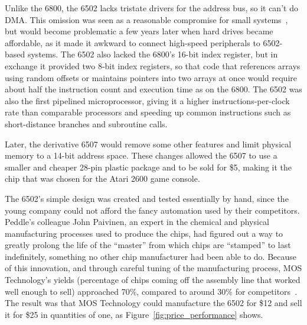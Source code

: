 \begin{tangent}
    Unlike the 6800, the 6502 lacks
    tristate drivers for the address bus, so it can't do DMA.  This
    omission was seen as a reasonable compromise
    for small systems~\cite{byte75:6502}, but would become
    problematic a few years later when hard drives became affordable, as
    it made it awkward to connect high-speed peripherals to 6502-based systems.
    The 6502 also lacked the 6800's 16-bit index register, but in exchange
    it provided two
     8-bit index registers, so that code that references arrays using
     random offsets or maintains pointers into two arrays at once would
     require about half the instruction count and execution time as on
     the 6800.
    The 6502 was also the first pipelined
    microprocessor, giving it a higher instructions-per-clock 
    rate than comparable processors and speeding up
    common instructions such as short-distance branches
     and subroutine calls.

    Later, the derivative 6507 would
    remove some other features and limit
    physical memory to a 14-bit address space.  These changes allowed
    the 6507 to
    use a smaller and cheaper 28-pin 
    plastic package and to be sold for \$5,
    making it the chip that was chosen for the Atari 2600 game console.
\end{tangent}

The 6502's simple design was created and tested essentially by hand,
since the young company could not afford the
fancy automation used by their competitors.
Peddle's colleague John Paivinen, an expert in the chemical
and physical manufacturing processes used to produce the chips, had
figured out a way to greatly prolong the life of the ``master'' from which chips
are ``stamped'' to last indefinitely,
something no other chip manufacturer had been able to do.
Because of this innovation, and through careful tuning of the manufacturing process,
MOS Technology's yields (percentage of chips coming off the assembly
line that worked well enough to sell) approached 70\%,
compared to around 30\% for competitors~\cite{commodore}.
The result was that MOS Technology could manufacture the 6502 for \$12
and sell it for \$25 in  quantities of one, as
Figure~\ref{fig:price_performance} shows.  

